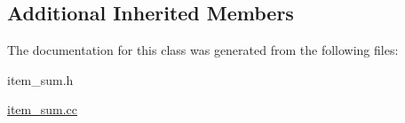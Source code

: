 \subsection*{Additional Inherited Members}


The documentation for this class was generated from the following files\+:\begin{DoxyCompactItemize}
\item 
item\+\_\+sum.\+h\item 
\mbox{\hyperlink{item__sum_8cc}{item\+\_\+sum.\+cc}}\end{DoxyCompactItemize}
